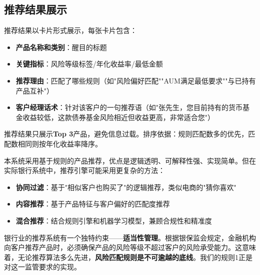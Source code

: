 \subsection{推荐结果展示}

推荐结果以卡片形式展示，每张卡片包含：

\begin{itemize}[leftmargin=2em]
  \item \textbf{产品名称和类别}：醒目的标题
  \item \textbf{关键指标}：风险等级标签/年化收益率/最低金额
  \item \textbf{推荐理由}：匹配了哪些规则（如"风险偏好匹配""AUM满足最低要求""与已持有产品互补"）
  \item \textbf{客户经理话术}：针对该客户的一句推荐语（如"张先生，您目前持有的货币基金收益较低，这款债券基金风险相近但收益更高，非常适合您"）
\end{itemize}

推荐结果只展示\textbf{Top 3}产品，避免信息过载。排序依据：规则匹配数多的优先，匹配数相同则按年化收益率降序。\par

\begin{theorybox}[从规则引擎到智能推荐]
本系统采用基于规则的产品推荐，优点是逻辑透明、可解释性强、实现简单。但在实际银行系统中，推荐引擎可能采用更复杂的方法：
\begin{itemize}[leftmargin=2em]
  \item \textbf{协同过滤}：基于"相似客户也购买了"的逻辑推荐，类似电商的"猜你喜欢"
  \item \textbf{内容推荐}：基于产品特征与客户偏好的匹配度推荐
  \item \textbf{混合推荐}：结合规则引擎和机器学习模型，兼顾合规性和精准度
\end{itemize}
银行业的推荐系统有一个独特约束——\textbf{适当性管理}。根据银保监会规定，金融机构向客户推荐产品时，必须确保产品的风险等级不超过客户的风险承受能力。这意味着，无论推荐算法多么先进，\textbf{风险匹配规则是不可逾越的底线}。我们的规则1正是对这一监管要求的实现。\end{theorybox}

